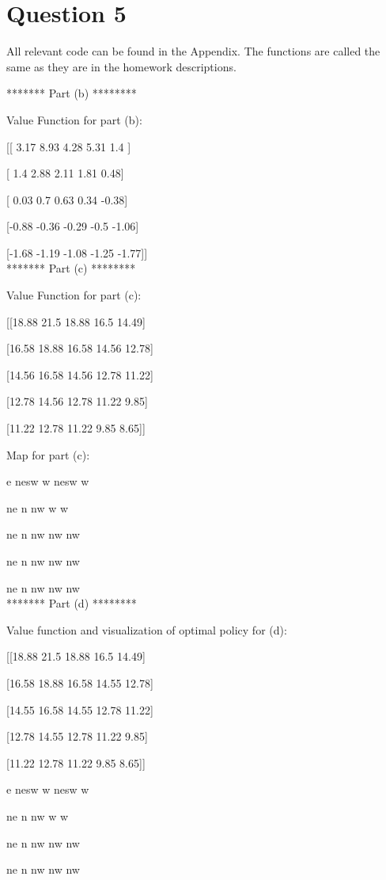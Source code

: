 \documentclass[11pt]{article}
\begin{document}
\section*{Question 5}

All relevant code can be found in the Appendix. The functions are called the same as they are in the homework descriptions.

******* Part (b) ********

Value Function for part (b):

[[ 3.17  8.93  4.28  5.31  1.4 ]

 [ 1.4   2.88  2.11  1.81  0.48]
 
 [ 0.03  0.7   0.63  0.34 -0.38]
 
 [-0.88 -0.36 -0.29 -0.5  -1.06]
 
 [-1.68 -1.19 -1.08 -1.25 -1.77]]\\
 
******* Part (c) ********

Value Function for part (c):

[[18.88 21.5  18.88 16.5  14.49]

 [16.58 18.88 16.58 14.56 12.78]
 
 [14.56 16.58 14.56 12.78 11.22]
 
 [12.78 14.56 12.78 11.22  9.85]
 
 [11.22 12.78 11.22  9.85  8.65]]
 
Map for part (c):

e nesw w nesw  w 

ne  n  nw  w   w 

ne  n  nw  nw  nw 

ne  n  nw  nw  nw 

ne  n  nw  nw  nw \\

******* Part (d) ********

Value function and visualization of optimal policy for (d):

[[18.88 21.5  18.88 16.5  14.49]

 [16.58 18.88 16.58 14.55 12.78]
 
 [14.55 16.58 14.55 12.78 11.22]
 
 [12.78 14.55 12.78 11.22  9.85]
 
 [11.22 12.78 11.22  9.85  8.65]]
 
e nesw w nesw w 

ne n nw w w 

ne n nw nw nw 

ne n nw nw nw 
\end{document}
